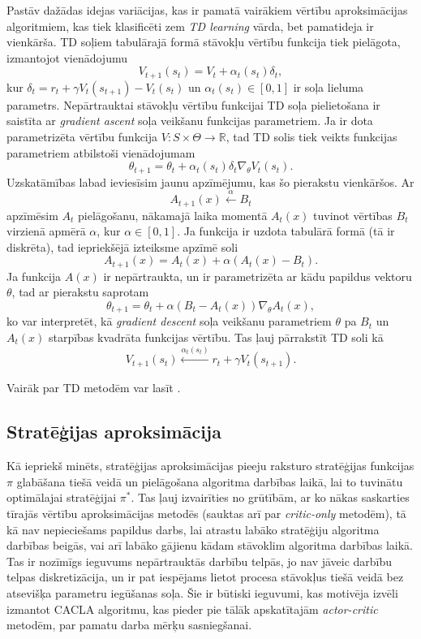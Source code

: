 \documentclass{ludis} %
\begin{document}
Pastāv dažādas
idejas variācijas, kas ir pamatā vairākiem vērtību aproksimācijas algoritmiem,
kas tiek klasificēti zem \textit{TD learning} vārda, bet pamatideja ir
vienkārša. TD soļiem tabulārajā formā stāvokļu vērtību funkcija tiek pielāgota,
izmantojot vienādojumu
\[
	V_{t+1}(s_t) = V_t + \alpha_t(s_t) \delta_t,
\]
kur $\delta_t = r_{t} + \gamma V_t(s_{t + 1}) - V_t(s_t)$ un $\alpha_t(s_t) \in
[0,1]$ ir soļa lieluma parametrs.
Nepārtrauktai stāvokļu vērtību funkcijai TD soļa pielietošana ir saistīta ar
\textit{gradient ascent} soļa veikšanu funkcijas parametriem. Ja ir dota
parametrizēta vērtību funkcija $V:S \times \Theta \rightarrow \mathbb{R}$, tad
TD solis tiek veikts funkcijas parametriem atbilstoši vienādojumam
\[
	\theta_{t+1} = \theta_t + \alpha_t(s_t) \delta_t \nabla_\theta V_t(s_t).
\]
Uzskatāmības labad ieviesīsim jaunu apzīmējumu, kas šo pierakstu vienkāršos.
Ar
\[
	A_{t+1}(x) \xleftarrow{\alpha} B_t
\]
apzīmēsim $A_t$ pielāgošanu, nākamajā laika momentā $A_t(x)$ tuvinot vērtības
$B_t$ virzienā apmērā $\alpha$, kur $\alpha \in [0,1]$. Ja funkcija ir uzdota
tabulārā formā (tā ir diskrēta), tad iepriekšējā izteiksme apzīmē soli
\[
	A_{t+1}(x) = A_t(x) + \alpha(A_t(x) - B_t).
\]
Ja funkcija $A(x)$ ir nepārtraukta, un ir parametrizēta ar kādu papildus vektoru
$\theta$, tad ar pierakstu saprotam
\[
	\theta_{t+1} = \theta_t + \alpha \left(B_t - A_t(x)\right) \nabla_\theta A_t(x),
\]
ko var interpretēt, kā \textit{gradient descent} soļa veikšanu parametriem
$\theta$ pa $B_t$ un $A_t(x)$ starpības kvadrāta funkcijas vērtību. Tas ļauj
pārrakstīt TD soli kā
\[
	V_{t+1}(s_t) \xleftarrow{\alpha_t(s_t)} r_t + \gamma V_t(s_{t + 1}).
\]

Vairāk par TD metodēm var lasīt \autocite{Hasselt2012}.

\subsection{Stratēģijas aproksimācija}
Kā iepriekš minēts, stratēģijas aproksimācijas pieeju raksturo stratēģijas
funkcijas $\pi$ glabāšana tiešā veidā un pielāgošana algoritma darbības laikā,
lai to tuvinātu optimālajai stratēģijai $\pi^*$. Tas ļauj izvairīties no
grūtībām, ar ko nākas saskarties tīrajās vērtību aproksimācijas metodēs (sauktas
arī par \textit{critic-only} metodēm), tā kā
nav nepieciešams papildus darbs, lai atrastu labāko stratēģiju algoritma
darbības beigās, vai arī labāko gājienu kādam stāvoklim algoritma darbības
laikā. Tas ir nozīmīgs ieguvums nepārtrauktās darbību telpās, jo nav jāveic
darbību telpas diskretizācija, un ir pat iespējams lietot procesa stāvokļus
tiešā veidā bez atsevišķa parametru iegūšanas soļa. Šie ir būtiski ieguvumi, kas
motivēja izvēli izmantot CACLA algoritmu, kas pieder pie tālāk apskatītajām
\textit{actor-critic} metodēm, par pamatu darba mērķu sasniegšanai.
\end{document}
